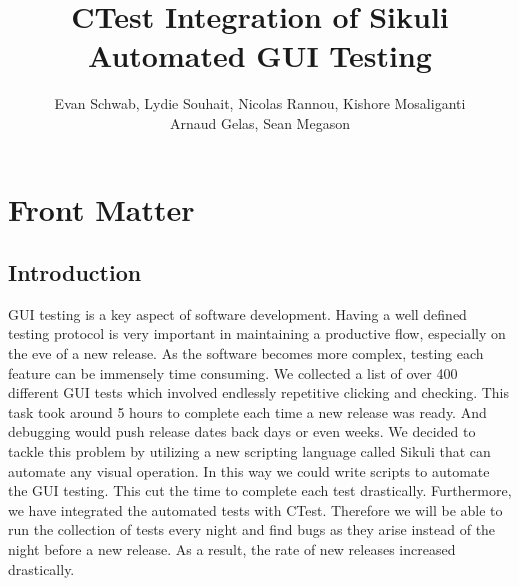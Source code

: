 \documentclass{InsightArticle}
\title{CTest Integration of Sikuli Automated GUI Testing}
\author{Evan Schwab, Lydie Souhait, Nicolas Rannou, Kishore Mosaliganti\\
Arnaud Gelas, Sean Megason}
\newcommand{\IJhandlerIDnumber}{3196}
\begin{document}
\IJhandlefooter{\IJhandlerIDnumber}


\ifpdf
\else
\fi

\maketitle

\ifhtml
\chapter*{Front Matter\label{front}}
\fi

\begin{abstract}
\noindent
 
\end{abstract}

\IJhandlenote{\IJhandlerIDnumber}

\tableofcontents
\section{Introduction}


GUI testing is a key aspect of software development. Having a well defined testing protocol is very
important in maintaining a productive flow, especially on the eve of a new release.  As the software becomes 
more complex, testing each feature can be immensely time consuming.  
We collected a list of over 400 different GUI tests which
involved endlessly repetitive clicking and checking.  This task took around 5 hours to complete each time a new release was ready.
And debugging would push release dates back days or even weeks.  We decided to tackle this problem by utilizing a new
scripting language called Sikuli that can automate any visual operation.  In this way we could write scripts to automate the GUI testing.
This cut the time to complete each test drastically.  Furthermore, we have integrated the automated tests with CTest.  Therefore we will be able to
run the collection of tests every night and find bugs as they arise instead of the night before a new release.  As a result,
the rate of new releases increased drastically.
\end{document}
